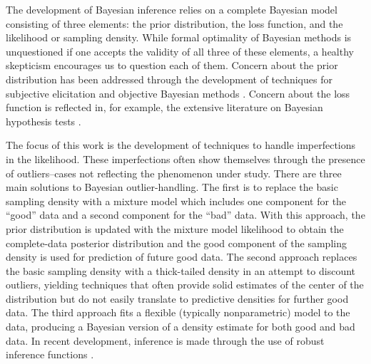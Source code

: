 \documentclass[12pt]{article}
\begin{document}
The development of Bayesian inference relies on a complete Bayesian model consisting of 
three elements:  the prior distribution, the loss function, and the likelihood or sampling density.  While formal optimality of Bayesian methods is unquestioned if one accepts the validity of all three of these elements, a healthy skepticism encourages us to question each of them.  Concern about the prior distribution has been addressed through the development of techniques for subjective elicitation \citep{garthwaite2005, ohagan2006} and objective Bayesian methods \citep{berger2006}.  
Concern about the loss function is reflected in, for example, the
extensive literature on Bayesian hypothesis tests \citep{kass1995}.  

The focus of this work is the development of techniques to handle imperfections in the likelihood.  These imperfections often show themselves through the presence of outliers--cases 
not reflecting the phenomenon under study. There are three main solutions to Bayesian outlier-handling.  The first is to replace the basic sampling
density with a mixture model which includes one component for the ``good'' data and a second 
component for the ``bad'' data.  With this approach, the prior distribution is updated with the  mixture model likelihood to obtain the complete-data posterior distribution and  the good component of the sampling density is used for prediction of future good data.  The second approach replaces the
basic sampling density with a thick-tailed density in an attempt to discount outliers, yielding techniques that 
often provide solid estimates of the center of the distribution but 
do not easily translate to predictive densities for further good data.  The third approach fits a flexible (typically nonparametric) model to  the data, producing a Bayesian version of a density estimate for both good and bad data.  In recent development, inference 
is made through the use of robust inference functions \citep{lee2014}.  
\end{document}
